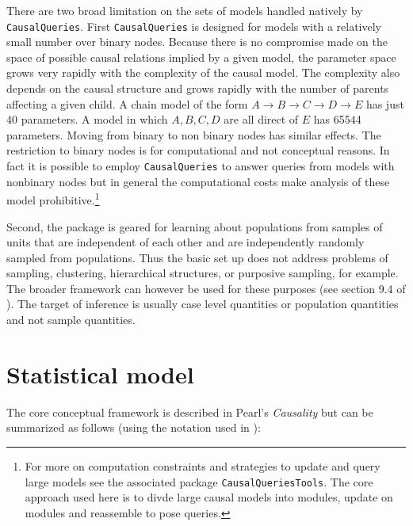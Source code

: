 \documentclass[
  11pt,
  article]{jss}
\begin{document}
There are two broad limitation on the sets of models handled natively by
\texttt{CausalQueries}. First \texttt{CausalQueries} is designed for
models with a relatively small number over binary nodes. Because there
is no compromise made on the space of possible causal relations implied
by a given model, the parameter space grows very rapidly with the
complexity of the causal model. The complexity also depends on the
causal structure and grows rapidly with the number of parents affecting
a given child. A chain model of the form
\(A \rightarrow B \rightarrow C \rightarrow D \rightarrow E\) has just
40 parameters. A model in which \(A, B, C, D\) are all direct of \(E\)
has 65544 parameters. Moving from binary to non binary nodes has similar
effects. The restriction to binary nodes is for computational and not
conceptual reasons. In fact it is possible to employ
\texttt{CausalQueries} to answer queries from models with nonbinary
nodes but in general the computational costs make analysis of these
model prohibitive.\footnote{For more on computation constraints and
  strategies to update and query large models see the associated package
  \texttt{CausalQueriesTools}. The core approach used here is to divde
  large causal models into modules, update on modules and reassemble to
  pose queries.}

Second, the package is geared for learning about populations from
samples of units that are independent of each other and are
independently randomly sampled from populations. Thus the basic set up
does not address problems of sampling, clustering, hierarchical
structures, or purposive sampling, for example. The broader framework
can however be used for these purposes (see section 9.4 of
\citet{ii2023}). The target of inference is usually case level
quantities or population quantities and not sample quantities.

\hypertarget{sec-theory}{%
\section{Statistical model}\label{sec-theory}}

The core conceptual framework is described in Pearl's \emph{Causality}
\citep{pearl2009causality} but can be summarized as follows (using the
notation used in \citet{ii2023}):
\end{document}

